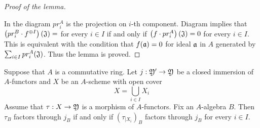 \begin{proof}[Proof of the lemma]
\begin{center}
\end{center}
In the diagram $pr^A_i$ is the projection on $i$-th component. Diagram implies that $\left(pr^B_i\cdot f^{\oplus I}\right)\left(\mathfrak{J}\right)=$ for every $i\in I$ if and only if $\left(f\cdot pr_i^A\right)(\mathfrak{J}) = 0$ for every $i\in I$. This is equivalent with the condition that $f(\mathfrak{a})=0$ for ideal $\mathfrak{a}$ in $A$ generated by $\sum_{i\in I}pr_i^A(\mathfrak{J})$. Thus the lemma is proved.
\end{proof}


\begin{lemma}\label{lemma:coveringsandfactorizations}
Suppose that $A$ is a commutative ring. Let $j:{\mathfrak Y}'\rightarrow {\mathfrak Y}$ be a closed immersion of $A$-functors and $X$ be an $A$-scheme with open cover
$$X=\bigcup_{i\in I}X_i$$
Assume that $\tau:X\rightarrow {\mathfrak Y}$ is a morphism of $A$-functors. Fix an $A$-algebra $B$. Then $\tau_B$ factors through $j_B$ if and only if $\left(\tau_{\mid X_i}\right)_B$ factors through $j_B$ for every $i\in I$.
\end{lemma}
